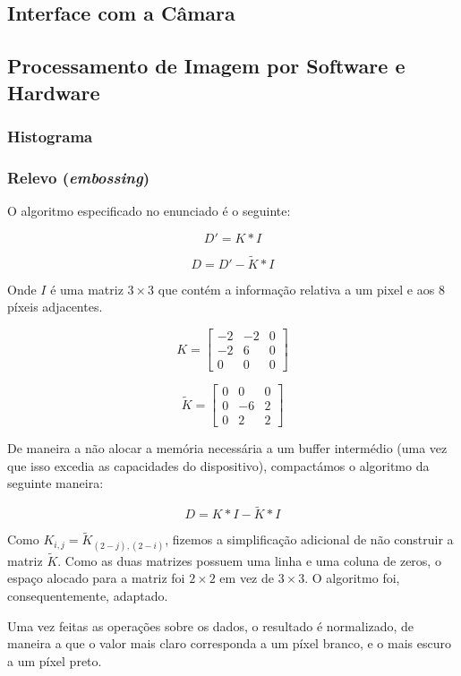 \documentclass[a4paper]{article}
\begin{document}
\subsection{Interface com a Câmara}

\subsection{Processamento de Imagem por Software e Hardware}
\subsubsection{Histograma}


\subsubsection{Relevo (\textit{embossing})}

O algoritmo especificado no enunciado é o seguinte:

\[
D' = K \ast I
\]

\[
D = D' - \widetilde{K} \ast I
\]

Onde $I$ é uma matriz $3 \times 3$ que contém a informação relativa a um pixel e aos 8 píxeis adjacentes.

\[ K =
\begin{bmatrix}
-2 & -2 & 0\\
-2 & 6 & 0\\
0 & 0 & 0
\end{bmatrix}
\]

\[\widetilde{K} = 
\begin{bmatrix}
0&0&0\\
0&-6&2\\
0&2&2
\end{bmatrix}
\]

De maneira a não alocar a memória necessária a um buffer intermédio (uma vez que isso excedia as capacidades do dispositivo), compactámos o algoritmo da seguinte maneira:

\[
D = K \ast I - \widetilde{K} \ast I
\]

Como $K_{i,j} = \widetilde{K}_{(2-j),(2-i)}$, fizemos a simplificação adicional de não construir a matriz $\widetilde{K}$. Como as duas matrizes possuem uma linha e uma coluna de zeros, o espaço alocado para a matriz foi $2\times2$ em vez de $3\times3$. O algoritmo foi, consequentemente, adaptado.

Uma vez feitas as operações sobre os dados, o resultado é normalizado, de maneira a que o valor mais claro corresponda a um píxel branco, e o mais escuro a um píxel preto.
\end{document}
